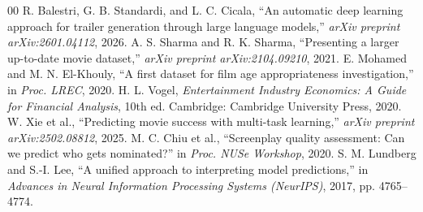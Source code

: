 \documentclass[conference]{IEEEtran}
\begin{document}
\begin{thebibliography}{00}
 R. Balestri, G. B. Standardi, and L. C. Cicala, ``An automatic deep learning approach for trailer generation through large language models,'' \textit{arXiv preprint arXiv:2601.04112}, 2026.
 A. S. Sharma and R. K. Sharma, ``Presenting a larger up-to-date movie dataset,'' \textit{arXiv preprint arXiv:2104.09210}, 2021.
 E. Mohamed and M. N. El-Khouly, ``A first dataset for film age appropriateness investigation,'' in \textit{Proc. LREC}, 2020.
 H. L. Vogel, \textit{Entertainment Industry Economics: A Guide for Financial Analysis}, 10th ed. Cambridge: Cambridge University Press, 2020.
 W. Xie et al., ``Predicting movie success with multi-task learning,'' \textit{arXiv preprint arXiv:2502.08812}, 2025.
 M. C. Chiu et al., ``Screenplay quality assessment: Can we predict who gets nominated?'' in \textit{Proc. NUSe Workshop}, 2020.
 S. M. Lundberg and S.-I. Lee, ``A unified approach to interpreting model predictions,'' in \textit{Advances in Neural Information Processing Systems (NeurIPS)}, 2017, pp. 4765--4774.
\end{thebibliography}
\end{document}
